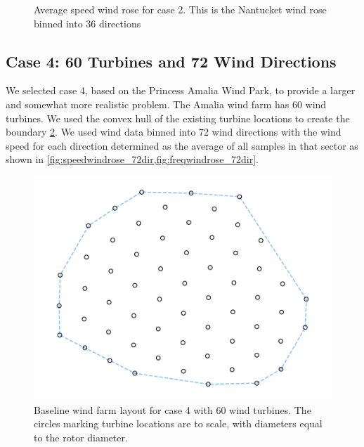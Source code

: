 \documentclass{jpconf}
\begin{document}
\begin{figure}[h!]
\begin{minipage}[t]{18pc}
		\caption{Average speed wind rose for case 2. This is the Nantucket wind rose binned into 36 directions \cite{wrcc2017}}
		\label{fig:speedwindrose_36dir}
	\end{minipage}
\end{figure}

\subsection{Case 4: 60 Turbines and 72 Wind Directions}
We selected case 4, based on the Princess Amalia Wind Park, to provide a larger and somewhat more realistic problem. The Amalia wind farm has 60 wind turbines. We used the convex hull of the existing turbine locations to create the boundary \cref{fig:layout4}. We used wind data binned into 72 wind directions with the wind speed for each direction determined as the average of all samples in that sector as shown in \cref{fig:speedwindrose_72dir,fig:freqwindrose_72dir}.
\begin{figure}[h!]
	\centering
	\begin{minipage}[t]{18pc}
		\centering
		\includegraphics[width=1.\textwidth, trim={1.0cm, 0cm, 1.0cm, 0cm}, clip]{final_images/layouts/60_turb_start.pdf}
		\caption{Baseline wind farm layout for case 4 with 60 wind turbines. The circles marking turbine locations are to scale, with diameters equal to the rotor diameter.}
		\label{fig:layout4}
	\end{minipage}\hspace{1pc}%
\end{figure}
\end{document}
